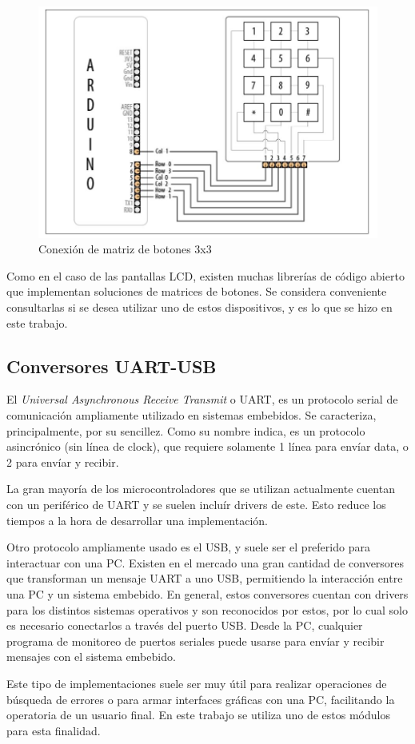 \begin{figure}[htbp]
	\centering
	\includegraphics[scale=.6]{./Figures/But_Matrix.JPG}
	\caption{Conexión de matriz de botones 3x3\citep{Arduino_Cookbook}}
	\label{fig:but_matrix}
\end{figure}

Como en el caso de las pantallas LCD, existen muchas librerías de código abierto que implementan soluciones de matrices de botones. Se considera conveniente consultarlas si se desea utilizar uno de estos dispositivos, y es lo que se hizo en este trabajo.

\subsection{Conversores UART-USB}

El \textit{Universal Asynchronous Receive Transmit} o UART, es un protocolo serial de comunicación ampliamente utilizado en sistemas embebidos. Se caracteriza, principalmente, por su sencillez. Como su nombre indica, es un protocolo asincrónico (sin línea de clock), que requiere solamente 1 línea para envíar data, o 2 para envíar y recibir.

La gran mayoría de los microcontroladores que se utilizan actualmente cuentan con un periférico de UART y se suelen incluír drivers de este. Esto reduce los tiempos a la hora de desarrollar una implementación.

Otro protocolo ampliamente usado es el USB, y suele ser el preferido para interactuar con una PC. Existen en el mercado una gran cantidad de conversores que transforman un mensaje UART a uno USB, permitiendo la interacción entre una PC y un sistema embebido. En general, estos conversores cuentan con drivers para los distintos sistemas operativos y son reconocidos por estos, por lo cual solo es necesario conectarlos a través del puerto USB. Desde la PC, cualquier programa de monitoreo de puertos seriales puede usarse para envíar y recibir mensajes con el sistema embebido.

Este tipo de implementaciones suele ser muy útil para realizar operaciones de búsqueda de errores o para armar interfaces gráficas con una PC, facilitando la operatoria de un usuario final. En este trabajo se utiliza uno de estos módulos para esta finalidad.
